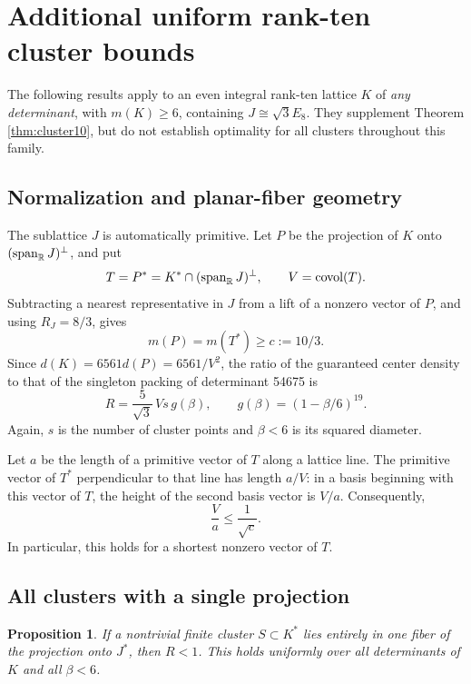 \documentclass[11pt,a4paper]{article}
\newtheorem{proposition}[theorem]{Proposition}
\theoremstyle{remark}\newtheorem{remark}[theorem]{Remark}
\newcommand{\spanR}{\operatorname{span}_{\R}}\newcommand{\diag}{\operatorname{diag}}
\begin{document}
\newpage
\appendix
\section{Additional uniform rank-ten cluster bounds}\label{app:uniform10}

The following results apply to an even integral rank-ten lattice $K$ of \emph{any determinant}, with $m(K)\ge6$, containing $J\cong\sqrt3E_8$. They supplement Theorem \ref{thm:cluster10}, but do not establish optimality for all clusters throughout this family.

\subsection{Normalization and planar-fiber geometry}

The sublattice $J$ is automatically primitive. Let $P$ be the projection of $K$ onto $(\spanR J)^\perp$, and put
\[
T=P^*=K^*\cap(\spanR J)^\perp,\qquad V=\operatorname{covol}(T).
\]
Subtracting a nearest representative in $J$ from a lift of a nonzero vector of $P$, and using $R_J=8/3$, gives
\[
m(P)=m(T^*)\ge c:=10/3.
\]
Since $d(K)=6561d(P)=6561/V^2$, the ratio of the guaranteed center density to that of the singleton packing of determinant 54675 is
\begin{equation}\label{eq:uniform10ratio}
R=\frac5{\sqrt3}\,V s\,g(\beta),\qquad
g(\beta)=(1-\beta/6)^{19}.
\end{equation}
Again, $s$ is the number of cluster points and $\beta<6$ is its squared diameter.

Let $a$ be the length of a primitive vector of $T$ along a lattice line. The primitive vector of $T^*$ perpendicular to that line has length $a/V$: in a basis beginning with this vector of $T$, the height of the second basis vector is $V/a$. Consequently,
\begin{equation}\label{eq:planarspacing}
\frac Va\le\frac1{\sqrt c}.
\end{equation}
In particular, this holds for a shortest nonzero vector of $T$.

\subsection{All clusters with a single projection}

\begin{proposition}\label{prop:onefiber10}
If a nontrivial finite cluster $S\subset K^*$ lies entirely in one fiber of the projection onto $J^*$, then $R<1$. This holds uniformly over all determinants of $K$ and all $\beta<6$.
\end{proposition}
\end{document}
